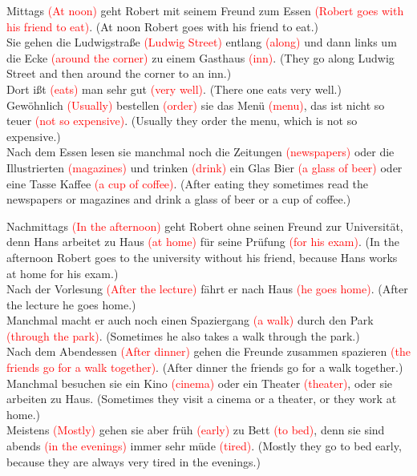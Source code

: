 \documentclass{article}
\begin{document}
Mittags \textcolor{red}{(At noon)} geht Robert mit seinem Freund zum Essen \textcolor{red}{(Robert goes with his friend to eat)}. (At noon Robert goes with his friend to eat.)\\
Sie gehen die Ludwigstraße \textcolor{red}{(Ludwig Street)} entlang \textcolor{red}{(along)} und dann links um die Ecke \textcolor{red}{(around the corner)} zu einem Gasthaus \textcolor{red}{(inn)}. (They go along Ludwig Street and then around the corner to an inn.)\\
Dort ißt \textcolor{red}{(eats)} man sehr gut \textcolor{red}{(very well)}. (There one eats very well.)\\
Gewöhnlich \textcolor{red}{(Usually)} bestellen \textcolor{red}{(order)} sie das Menü \textcolor{red}{(menu)}, das ist nicht so teuer \textcolor{red}{(not so expensive)}. (Usually they order the menu, which is not so expensive.)\\
Nach dem Essen lesen sie manchmal noch die Zeitungen \textcolor{red}{(newspapers)} oder die Illustrierten \textcolor{red}{(magazines)} und trinken \textcolor{red}{(drink)} ein Glas Bier \textcolor{red}{(a glass of beer)} oder eine Tasse Kaffee \textcolor{red}{(a cup of coffee)}. (After eating they sometimes read the newspapers or magazines and drink a glass of beer or a cup of coffee.)

Nachmittags \textcolor{red}{(In the afternoon)} geht Robert ohne seinen Freund zur Universität, denn Hans arbeitet zu Haus \textcolor{red}{(at home)} für seine Prüfung \textcolor{red}{(for his exam)}. (In the afternoon Robert goes to the university without his friend, because Hans works at home for his exam.)\\
Nach der Vorlesung \textcolor{red}{(After the lecture)} fährt er nach Haus \textcolor{red}{(he goes home)}. (After the lecture he goes home.)\\
Manchmal macht er auch noch einen Spaziergang \textcolor{red}{(a walk)} durch den Park \textcolor{red}{(through the park)}. (Sometimes he also takes a walk through the park.)\\
Nach dem Abendessen \textcolor{red}{(After dinner)} gehen die Freunde zusammen spazieren \textcolor{red}{(the friends go for a walk together)}. (After dinner the friends go for a walk together.)\\
Manchmal besuchen sie ein Kino \textcolor{red}{(cinema)} oder ein Theater \textcolor{red}{(theater)}, oder sie arbeiten zu Haus. (Sometimes they visit a cinema or a theater, or they work at home.)\\
Meistens \textcolor{red}{(Mostly)} gehen sie aber früh \textcolor{red}{(early)} zu Bett \textcolor{red}{(to bed)}, denn sie sind abends \textcolor{red}{(in the evenings)} immer sehr müde \textcolor{red}{(tired)}. (Mostly they go to bed early, because they are always very tired in the evenings.)
\end{document}
